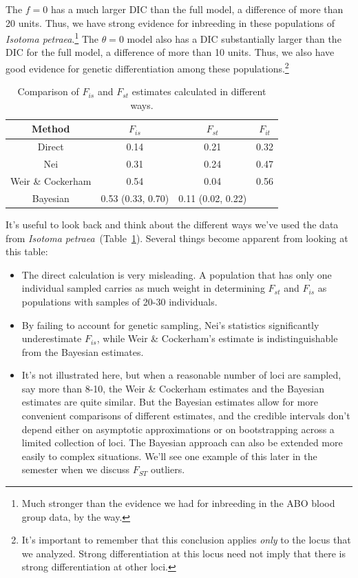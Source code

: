 \documentclass[12pt]{article}
\begin{document}
The $f=0$ has a much larger DIC than the full model, a difference of
more than 20 units. Thus, we have strong evidence for inbreeding in
these populations of {\it Isotoma petraea}.\footnote{Much stronger
  than the evidence we had for inbreeding in the ABO blood group data,
  by the way.} The $\theta = 0$ model also has a DIC substantially
larger than the DIC for the full model, a difference of more than 10
units. Thus, we also have good evidence for genetic differentiation
among these populations.\footnote{It's important to remember that this
  conclusion applies {\it only\/} to the locus that we
  analyzed. Strong differentiation at this locus need not imply that
  there is strong differentiation at other loci.}

\begin{table}
\begin{center}
\begin{tabular}{c|ccc}
\hline\hline
Method & $F_{is}$ & $F_{st}$ & $F_{it}$ \\
\hline
Direct            & 0.14 & 0.21 & 0.32 \\
Nei               & 0.31 & 0.24 & 0.47 \\
Weir \& Cockerham & 0.54 & 0.04 & 0.56 \\
Bayesian          & 0.53 (0.33, 0.70) & 0.11 (0.02, 0.22) \\
\hline
\end{tabular}
\end{center}
\caption{Comparison of $F_{is}$ and $F_{st}$ estimates calculated in
  different ways.}\label{table:compare}
\end{table}

It's useful to look back and think about the different ways we've used
the data from {\it Isotoma
  petraea}~(Table~\ref{table:compare}). Several things become apparent
from looking at this table:

\begin{itemize}

\item The direct calculation is very misleading. A population that
  has only one individual sampled carries as much weight in
  determining $F_{st}$ and $F_{is}$ as populations with samples of
  20-30 individuals.

\item By failing to account for genetic sampling, Nei's statistics
  significantly underestimate $F_{is}$, while Weir \& Cockerham's
  estimate is indistinguishable from the Bayesian estimates.

\item It's not illustrated here, but when a reasonable number of loci
  are sampled, say more than 8-10, the Weir \& Cockerham estimates and
  the Bayesian estimates are quite similar. But the Bayesian estimates
  allow for more convenient comparisons of different estimates, and
  the credible intervals don't depend either on asymptotic
  approximations or on bootstrapping across a limited collection of
  loci. The Bayesian approach can also be extended more easily to
  complex situations. We'll see one example of this later in the
  semester when we discuss $F_{ST}$ outliers.

\end{itemize}




\ccLicense
\end{document}
